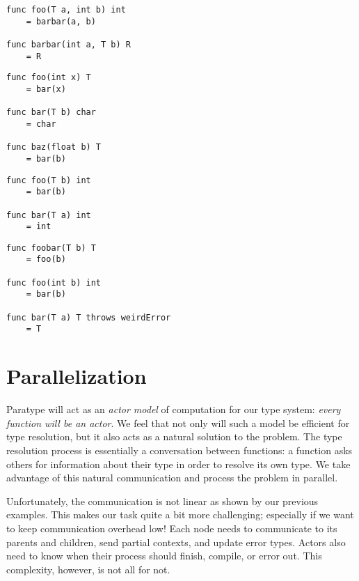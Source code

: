 \documentclass{acm_proc_article-sp}
\begin{document}
\begin{lstlisting}[caption=Explicit context provided by child and parent,language=Paratype]
func foo(T a, int b) int
    = barbar(a, b)

func barbar(int a, T b) R
    = R
\end{lstlisting}

\begin{lstlisting}[caption=Need to maintain partial contexts,language=Paratype]
func foo(int x) T
    = bar(x)

func bar(T b) char
    = char

func baz(float b) T
    = bar(b)
\end{lstlisting}

\begin{lstlisting}[caption=Unhalting context resolution,language=Paratype]
func foo(T b) int
    = bar(b)

func bar(T a) int
    = int
\end{lstlisting}

\begin{lstlisting}[caption=Errors,language=Paratype]
func foobar(T b) T
    = foo(b)

func foo(int b) int
    = bar(b)

func bar(T a) T throws weirdError
    = T
\end{lstlisting}


\section{Parallelization}

Paratype will act as an \emph{actor model} of computation for our type
system: \emph{every function will be an actor}. We feel that not only will
such a model be efficient for type resolution, but it also acts as a
natural solution to the problem. The type resolution process is
essentially a conversation between functions: a function asks others for
information about their type in order to resolve its own type. We take
advantage of this natural communication and process the problem in
parallel.

Unfortunately, the communication is not linear as shown by our
previous examples. This makes our task quite a bit more challenging;
especially if we want to keep communication overhead low! Each node
needs to communicate to its parents and children, send partial
contexts, and update error types. Actors also need to know when their
process should finish, compile, or error out. This complexity,
however, is not all for not.
\end{document}
